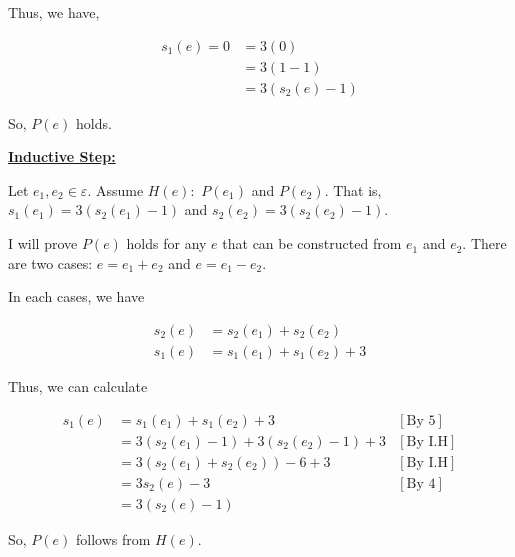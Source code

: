 \documentclass[12pt]{article}
\begin{document}
\begin{itemize}
\begin{mdframed}
        Thus, \color{red}we have,\color{black}

        \begin{align}
            s_1(e) = 0 &= 3(0)\\
            &= 3(1-1)\\
            &= 3(s_2(e) - 1)
        \end{align}

        \bigskip

        So, $P(e)$ holds.

        \bigskip

        \underline{\textbf{Inductive Step:}}

        \bigskip

        Let $e_1, e_2 \in \varepsilon$. Assume $H(e):$ $P(e_1)$ and $P(e_2)$.
        That is, $s_1(e_1) = 3(s_2(e_1) - 1)$ and $s_2(e_2) = 3(s_2(e_2) - 1)$.
        \bigskip

        \color{red}I will prove $P(e)$ holds for any $e$ that can be constructed
        from $e_1$ and $e_2$. There are two cases:  $e = e_1 + e_2$ and $e = e_1 - e_2$.

        \bigskip

        In each cases, we have\color{black}

        \bigskip

        \begin{align}
            s_2(e) &= s_2(e_1) + s_2(e_2)\\
            s_1(e) &= s_1(e_1) + s_1(e_2) + 3
        \end{align}

        \bigskip

        Thus, we can calculate

        \begin{align}
            s_1(e) &= s_1(e_1) + s_1(e_2) + 3 & [\text{By 5}]\\
            &= 3(s_2(e_1) - 1) + 3(s_2(e_2) - 1) + 3 & [\text{By I.H}]\\
            &= 3(s_2(e_1) + s_2(e_2)) - 6 + 3 & [\text{By I.H}]\\
            &= 3s_2(e) - 3 & [\text{By 4}]\\
            &= 3(s_2(e) - 1)
        \end{align}

        \bigskip

        \color{red}So, $P(e)$ follows from $H(e)$.\color{black}
    \end{mdframed}


\end{itemize}
\end{document}
